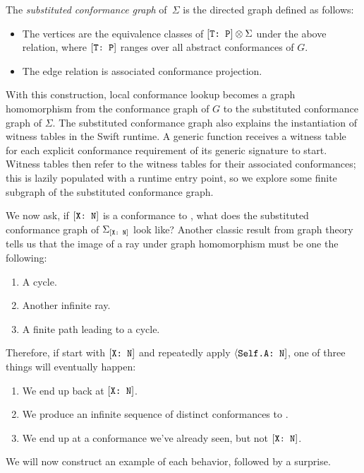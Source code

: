 \documentclass[../generics]{subfiles}
\begin{document}
\begin{definition}
The \emph{substituted conformance graph} of~$\Sigma$ is the directed graph defined as follows:
\begin{itemize}
\item The vertices are the equivalence classes of $[\texttt{T:~P}]\otimes\Sigma$ under the above relation, where $[\texttt{T:~P}]$ ranges over all abstract conformances of $G$.
\item The edge relation is associated conformance projection.
\end{itemize}

With this construction, local conformance lookup becomes a graph homomorphism from the conformance graph of $G$ to the substituted conformance graph of $\Sigma$. The substituted conformance graph also explains the instantiation of witness tables in the Swift runtime. A generic function receives a witness table for each explicit conformance requirement of its generic signature to start. Witness tables then refer to the witness tables for their associated conformances; this is lazily populated with a runtime entry point, so we explore some finite subgraph of the substituted conformance graph.
\end{definition}

We now ask, if $[\texttt{X:~N}]$ is a conformance to \tN, what does the substituted conformance graph of $\Sigma_{[\texttt{X:~N}]}$ look like? Another classic result from graph theory tells us that the image of a ray under graph homomorphism must be one the following:
\begin{enumerate}
\item A cycle.
\item Another infinite ray.
\item A finite path leading to a cycle.
\end{enumerate}
Therefore, if start with $[\texttt{X:~N}]$ and repeatedly apply $\langle\texttt{Self.A:~N}]$, one of three things will eventually happen:
\begin{enumerate}
\item We end up back at $[\texttt{X:~N}]$.
\item We produce an infinite sequence of distinct conformances to \tN.
\item We end up at a conformance we've already seen, but not $[\texttt{X:~N}]$.
\end{enumerate}
We will now construct an example of each behavior, followed by a surprise.
\end{document}
